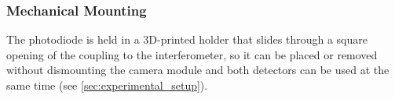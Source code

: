 \subsubsection{Mechanical Mounting}

The photodiode is held in a 3D-printed holder that slides through a square opening of the coupling to the interferometer, so it can be placed or removed without dismounting the camera module and both detectors can be used at the same time (see \cref{sec:experimental_setup}).
